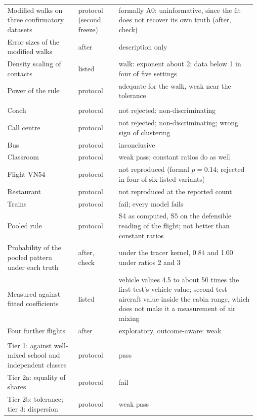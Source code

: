 {\begin{longtable}{@{}>{\raggedright}p{4.6cm}>{\raggedright}p{1.5cm}>{\raggedright\arraybackslash}p{9.4cm}@{}}
Modified walks on three confirmatory datasets & protocol (second freeze) & formally A0; uninformative, since the fit does not recover its own truth (after, check) \\
Error sizes of the modified walks & after & description only \\
Density scaling of contacts & listed & walk: exponent about 2; data below 1 in four of five settings \\
Power of the rule & protocol & adequate for the walk, weak near the tolerance \\
\addlinespace
\multicolumn{3}{@{}l}{\emph{Tracer measurements (Section~\ref{M-s8b_evidence:sec:tracer})}} \\
Coach & protocol & not rejected; non-discriminating \\
Call centre & protocol & not rejected; non-discriminating; wrong sign of clustering \\
Bus & protocol & inconclusive \\
Classroom & protocol & weak pass; constant ratios do as well \\
Flight VN54 & protocol & not reproduced (formal $p=0.14$; rejected in four of six listed variants) \\
Restaurant & protocol & not reproduced at the reported count \\
Trains & protocol & fail; every model fails \\
Pooled rule & protocol & S4 as computed, S5 on the defensible reading of the flight; not better than constant ratios \\
Probability of the pooled pattern under each truth & after, check & 0.23 under the tracer kernel, 0.84 and 1.00 under ratios 2 and 3 \\
Measured against fitted coefficients & listed & vehicle values 4.5 to about 50 times the first test's vehicle value; second-test aircraft value inside the cabin range, which does not make it a measurement of air mixing \\
Four further flights & after & exploratory, outcome-aware: weak \\
\addlinespace
\multicolumn{3}{@{}l}{\emph{Zone level (Section~\ref{M-s8b_evidence:sec:zones})}} \\
Tier 1: against well-mixed school and independent classes & protocol & pass \\
Tier 2a: equality of shares & protocol & fail \\
Tier 2b: tolerance; tier 3: dispersion & protocol & weak pass \\

\end{longtable}}
